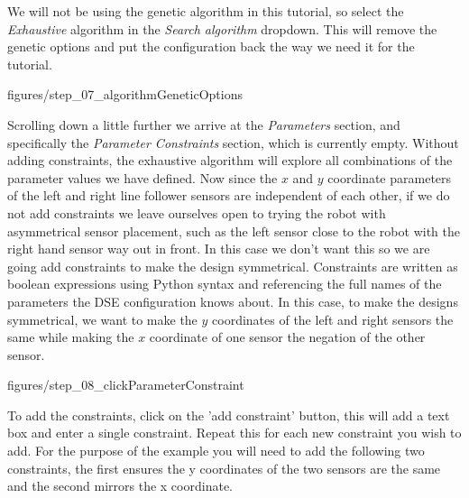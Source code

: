 \documentclass[11pt,a4paper]{../tutorial}
\begin{document}
{
We will not be using the genetic algorithm in this tutorial, so select the \emph{Exhaustive} algorithm in the \emph{Search algorithm} dropdown.  This will remove the genetic options and put the configuration back the way we need it for the tutorial.

\begin{center}\begin{annotation}[width=0.7\linewidth,trim=0 0 0 0,clip]{figures/step_07_algorithmGeneticOptions}
    \end{annotation}\end{center}

\newpage

Scrolling down a little further we arrive at the \emph{Parameters} section, and specifically the \emph{Parameter Constraints} section, which is currently empty.  Without adding constraints, the exhaustive algorithm will explore all combinations of the parameter values we have defined.  Now since the $x$ and $y$ coordinate parameters of the left and right line follower sensors are independent of each other, if we do not add constraints we leave ourselves open to trying the robot with asymmetrical sensor placement, such as the left sensor close to the robot with the right hand sensor way out in front.  In this case we don’t want this so we are going add constraints to make the design symmetrical.  Constraints are written as boolean expressions using Python syntax and referencing the full names of the parameters the DSE configuration knows about.  In this case, to make the designs symmetrical, we want to make the $y$ coordinates of the left and right sensors the same while making the $x$ coordinate of one sensor the negation of the other sensor.

\begin{center}\begin{annotation}[width=0.7\linewidth,trim=0 0 0 0,clip]{figures/step_08_clickParameterConstraint}
    \end{annotation}\end{center}

\newpage

To add the constraints, click on the 'add constraint' button, this will add a text box and enter a single constraint.  Repeat this for each new constraint you wish to add.  For the purpose of the example you will need to add the following two constraints, the first ensures the y coordinates of the two sensors are the same and the second mirrors the x coordinate.

}
\end{document}
